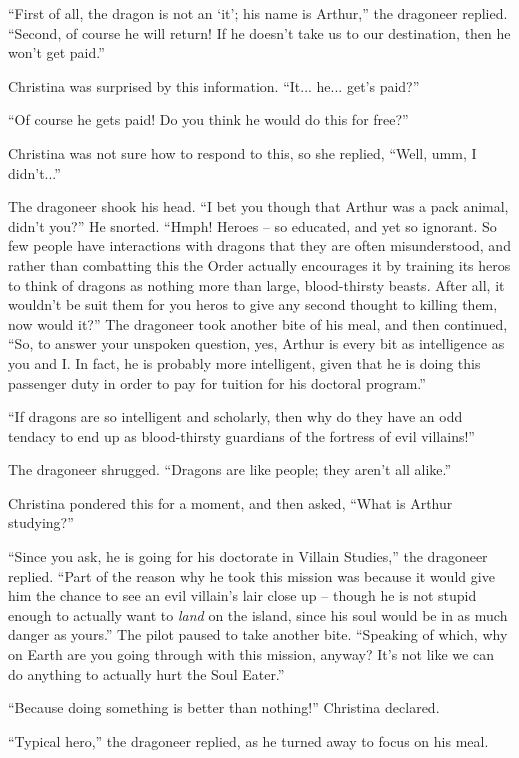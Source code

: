 \documentclass[showtrims,b6paper,draft,10pt]{memoir}
\begin{document}
``First of all, the dragon is not an `it';  his name is Arthur,'' the dragoneer replied.  ``Second, of course he will return!  If he doesn't take us to our destination, then he won't get paid.''

Christina was surprised by this information.  ``It... he... get's paid?''

``Of course he gets paid!  Do you think he would do this for free?''

Christina was not sure how to respond to this, so she replied, ``Well, umm, I didn't...''

The dragoneer shook his head.  ``I bet you though that Arthur was a pack animal, didn't you?''   He snorted.  ``Hmph!  Heroes -- so educated, and yet so ignorant.  So few people have interactions with dragons that they are often misunderstood, and rather than combatting this the Order actually encourages it by training its heros to think of dragons as nothing more than  large, blood-thirsty beasts.  After all, it wouldn't be suit them for you heros to give any second thought to killing them, now would it?''  The dragoneer took another bite of his meal, and then continued,  ``So, to answer your unspoken question, yes, Arthur is every bit as intelligence as you and I.  In fact, he is probably more intelligent, given that he is doing this passenger duty in order to pay for tuition for his doctoral program.''

``If dragons are so intelligent and scholarly, then why do they have an odd tendacy to end up as blood-thirsty guardians of the fortress of evil villains!''

The dragoneer shrugged.  ``Dragons are like people;  they aren't all alike.''

Christina pondered this for a moment, and then asked, ``What is Arthur studying?''

``Since you ask, he is going for his doctorate in Villain Studies,''  the dragoneer replied.  ``Part of the reason why he took this mission was because it would give him the chance to see an evil villain's lair close up -- though he is not stupid enough to actually want to \emph{land} on the island, since his soul would be in as much danger as yours.''  The pilot paused to take another bite.  ``Speaking of which, why on Earth are you going through with this mission, anyway?  It's not like we can do anything to actually hurt the Soul Eater.''

``Because doing something is better than nothing!'' Christina declared.

``Typical hero,'' the dragoneer replied, as he turned away to focus on his meal.
\end{document}
